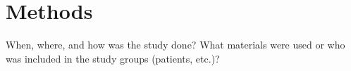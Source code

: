 \chapter{Methods}

When, where, and how was the study done? What materials were used or who was included in the study groups (patients, etc.)?
